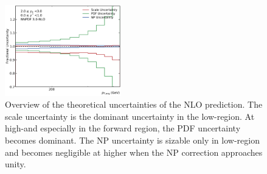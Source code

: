 \begin{figure}[htp]
    \includegraphics[width=0.45\textwidth]{figures/theory/theo_unc_yb2ys0.pdf}
    \caption[Overview of theoretical uncertaintites]{Overview of the theoretical uncertainties of the NLO prediction.
    The scale uncertainty is the dominant uncertainty in the low-\pt region. At
    high-\pt and especially in the forward region, the PDF uncertainty becomes
    dominant. The NP uncertainty is sizable only in low-\pt region and becomes
    negligible at higher \pt when the NP correction approaches unity.}
    \label{fig:theo_uncertainties}
\end{figure}
